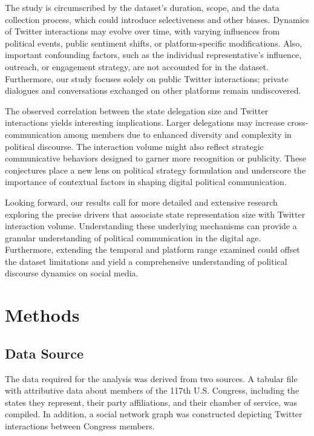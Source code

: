 \documentclass[11pt]{article}
\begin{document}
The study is circumscribed by the dataset's duration, scope, and the data collection process, which could introduce selectiveness and other biases. Dynamics of Twitter interactions may evolve over time, with varying influences from political events, public sentiment shifts, or platform-specific modifications. Also, important confounding factors, such as the individual representative's influence, outreach, or engagement strategy, are not accounted for in the dataset. Furthermore, our study focuses solely on public Twitter interactions; private dialogues and conversations exchanged on other platforms remain undiscovered.

The observed correlation between the state delegation size and Twitter interactions yields interesting implications. Larger delegations may increase cross-communication among members due to enhanced diversity and complexity in political discourse. The interaction volume might also reflect strategic communicative behaviors designed to garner more recognition or publicity. These conjectures place a new lens on political strategy formulation and underscore the importance of contextual factors in shaping digital political communication.

Looking forward, our results call for more detailed and extensive research exploring the precise drivers that associate state representation size with Twitter interaction volume. Understanding these underlying mechanisms can provide a granular understanding of political communication in the digital age. Furthermore, extending the temporal and platform range examined could offset the dataset limitations and yield a comprehensive understanding of political discourse dynamics on social media.

\section*{Methods}

\subsection*{Data Source}
The data required for the analysis was derived from two sources. A tabular file with attributive data about members of the 117th U.S. Congress, including the states they represent, their party affiliations, and their chamber of service, was compiled. In addition, a social network graph was constructed depicting Twitter interactions between Congress members.
\end{document}
